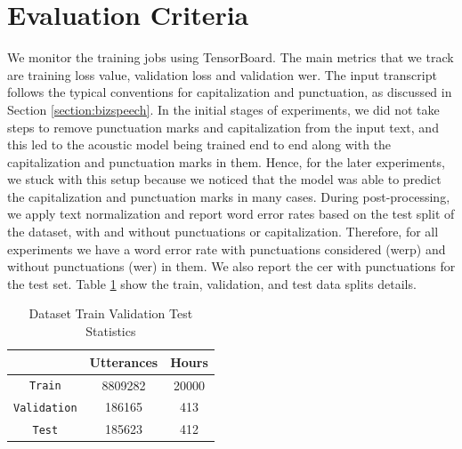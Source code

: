 \section{Evaluation Criteria}
\label{section:eval}
We monitor the training jobs using TensorBoard. The main metrics that we track are training loss value, validation loss and validation \acrshort{wer}. The input transcript follows the typical conventions for capitalization and punctuation, as discussed in Section \ref{section:bizspeech}. In the initial stages of experiments, we did not take steps to remove punctuation marks and capitalization from the input text, and this led to the acoustic model being trained end to end along with the capitalization and punctuation marks in them. Hence, for the later experiments, we stuck with this setup because we noticed that the model was able to predict the capitalization and punctuation marks in many cases. During post-processing, we apply text normalization and report word error rates based on the test split of the dataset, with and without punctuations or capitalization. Therefore, for all experiments we have a word error rate with punctuations considered (\acrshort{werp}) and without punctuations (\acrshort{wer}) in them. We also report the \acrfull{cer} with punctuations for the test set. Table \ref{table:splits} show the train, validation, and test data splits details.

\begin{table}[ht]
\centering
\begin{tabular}{ c | c  c }
\hline
  & Utterances & Hours \\
 \hline
 \verb|Train| & 8809282 & 20000 \\ 
 \verb|Validation| & 186165 & 413 \\ 
 \verb|Test| & 185623 & 412 \\ 
 \hline
\end{tabular}
\caption{\label{table:splits}Dataset Train Validation Test Statistics }
\end{table}

